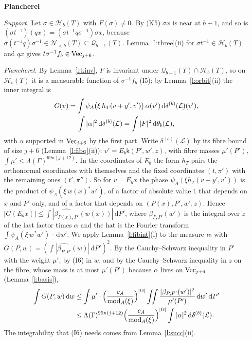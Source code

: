 \documentclass[11pt,a4paper]{article}
\makeatletter
\newcommand{\sect}[2]{\refstepcounter{section}\label{#2}\par\addvspace{19pt plus 4pt minus 2pt}\Needspace{7\baselineskip}%
  \noindent\llap{{\fontsize{13.2}{16}\selectfont\bfseries\color{inkfaint}\thesection}\hspace{9pt}}%
  {\fontsize{13.2}{16}\selectfont\bfseries\color{ink}#1}\par\nopagebreak\vspace{-1pt}}
\theoremstyle{plainx}
\theoremstyle{uprightx}
\renewenvironment{proof}[1][Proof]{\par\pushQED{\qed}\normalfont\topsep0pt\partopsep0pt
  \trivlist\item[\hskip\labelsep\itshape #1.]\ignorespaces}{\popQED\endtrivlist\@endpefalse}
\newcommand{\cL}{\mathcal{L}}
\newcommand{\dd}{\mathrm{d}}
\newcommand{\Hl}[2]{\mathcal{H}_{#1}(#2)}
\newcommand{\Ql}[2]{\mathcal{Q}_{#1}(#2)}
\newcommand{\Nb}[2]{\mathcal{N}_{<#1}(#2)}
\newcommand{\modA}{\operatorname{mod}_A}
\newcommand{\quadric}[2]{\delta^{(#2)}(#1)}
\newcommand{\Inp}[1]{\textup{(#1)}}
\makeatother
\begin{document}
\sect{Plancherel}{s:plancherel}
\begin{proof}[Proof of Theorem C\textup{(i)}]
\emph{Support.} Let $\sigma\in\Hl{b}{T}$ with $F(\sigma)\ne0$. By (K5) $\sigma x$ is near at $b+1$, and so is
$(\sigma t^{-1})(qx)=(\sigma t^{-1}q\sigma^{-1})\sigma x$, because $\sigma(t^{-1}q)\sigma^{-1}\in\Nb{b}{T}
\subseteq\Ql{b+1}{T}$. Lemma~\ref{l:three}(ii) for $\sigma t^{-1}\in\Hl{b}{T}$ and $qx$ gives
$t\sigma^{-1}f_b\in\mathrm{Vec}_{j+6}$.

\emph{Plancherel.} By Lemma~\ref{l:kinv}, $F$ is invariant under $\Ql{b+1}{T}\cap\Hl{b}{T}$, so on $\Hl{b}{T}$ it is
a measurable function of $\sigma^{-1}f_b$ \Inp{I5}; by Lemma~\ref{l:orbit}(ii) the inner integral is
\[\begin{gathered}G(v)=\int\psi_A\bigl(\xi\,h_T(v+y',v')\bigr)\,\alpha(v')\,\dd\quadric{\cL}{b}(v'),\\
\int|\alpha|^2\,\dd\quadric{\cL}{b}=\int|F|^2\,\dd\floorMeasure{\cL}{b},\end{gathered}\]
with $\alpha$ supported in $\mathrm{Vec}_{j+6}$ by the first part. Write $\quadric{\cL}{b}$ by its fibre bound of
size $j+6$ (Lemma~\ref{l:fibq}(ii)): $v'=E_b\mathsf{k}(P',w',z)$, with fibre masses $\mu'(P')$,
$\int\mu'\le\Lambda(\Gamma)^{99n(j+12)}$. In the coordinates of $E_b$ the form $h_T$ pairs the orthonormal
coordinates with themselves and the fixed coordinates $(t,\pi')$ with the remaining ones $(t',\pi'')$. So for
$v=E_bx$ the phase $\psi_A(\xi h_T(v+y',v'))$ is the product of $\psi_A(\xi\,w(x)^{*}w')$, of a factor of absolute
value $1$ that depends on $x$ and $P'$ only, and of a factor that depends on $(P(x),P',w',z)$. Hence
$|G(E_bx)|\le\int|\widehat{\beta_{P(x),P'}}(w(x))|\,\dd P'$, where $\beta_{P,P'}(w')$ is the integral over $z$ of the
last factor times $\alpha$ and the hat is the Fourier transform $\int\psi_A(\xi\,w^{*}w')\,\cdot\,\dd w'$. We apply
Lemma~\ref{l:fibint}(i) to the measure $\mathsf{m}$ with $G(P,w)=(\int|\widehat{\beta_{P,P'}}(w)|\,\dd P')^{2}$. By the
Cauchy--Schwarz inequality in $P'$ with the weight $\mu'$, by \Inp{I6} in $w$, and by the Cauchy--Schwarz
inequality in $z$ on the fibre, whose mass is at most $\mu'(P')$ because $\alpha$ lives on $\mathrm{Vec}_{j+6}$
(Lemma~\ref{l:basis}),
\[\begin{aligned}\int G(P,w)\,\dd w&\le\int\mu'\cdot\Bigl(\frac{c_A}{\modA(\xi)}\Bigr)^{|\Omega|}\iint\frac{|\beta_{P,P'}(w')|^{2}}{\mu'(P')}\,\dd w'\,\dd P'\\
&\le\Lambda(\Gamma)^{99n(j+12)}\Bigl(\frac{c_A}{\modA(\xi)}\Bigr)^{|\Omega|}\int|\alpha|^{2}\,\dd\quadric{\cL}{b}.\end{aligned}\]
The integrability that \Inp{I6} needs comes from Lemma~\ref{l:succ}(ii).
\end{proof}
\end{document}
